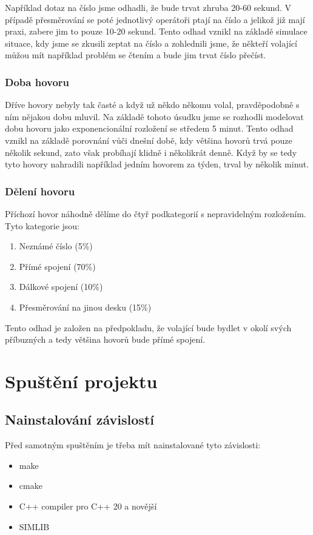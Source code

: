 \documentclass{article}
\begin{document}
Například dotaz na číslo jsme odhadli, že bude trvat zhruba 20-60 sekund.
V případě přesměrování se poté jednotlivý operátoři ptají na číslo a jelikož
již mají praxi, zabere jim to pouze 10-20 sekund. Tento odhad vznikl na základě
simulace situace, kdy jsme se zkusili zeptat na číslo a zohlednili jsme, že
někteří volající můžou mít například problém se čtením a bude jim trvat číslo
přečíst.

\subsubsection*{Doba hovoru}

Dříve hovory nebyly tak časté a když už někdo někomu volal, pravděpodobně s ním
nějakou dobu mluvil. Na základě tohoto úsudku jsme se rozhodli modelovat dobu
hovoru jako exponencionální rozložení se středem 5 minut. Tento odhad vznikl
na základě porovnání vůči dnešní době, kdy většina hovorů trvá pouze několik
sekund, zato však probíhají klidně i několikrát denně. Když by se tedy tyto
hovory nahradili například jedním hovorem za týden, trval by několik minut.

\subsubsection*{Dělení hovoru}

Příchozí hovor náhodně dělíme do čtyř podkategorií s nepravidelným rozložením.
Tyto kategorie jsou:
\begin{enumerate}
    \item Neznámé číslo (5\%)
    \item Přímé spojení (70\%)
    \item Dálkové spojení (10\%)
    \item Přesměrování na jinou desku (15\%)
\end{enumerate}

Tento odhad je založen na předpokladu, že volající bude bydlet v okolí svých
příbuzných a tedy většina hovorů bude přímé spojení.

\section{Spuštění projektu}

\subsection*{Nainstalování závislostí}

Před samotným spuštěním je třeba mít nainstalované tyto závislosti:
\begin{itemize}
    \item make
    \item cmake
    \item C++ compiler pro C++ 20 a novější
    \item SIMLIB
\end{itemize}
\end{document}
